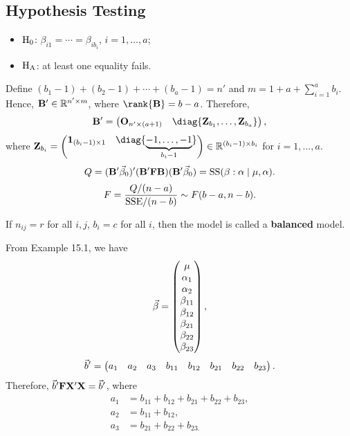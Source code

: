 \subsection*{Hypothesis Testing}
\begin{itemize}
    \item $ \text{H}_0 $: $ \beta_{i1}=\cdots=\beta_{ib_i} $, $ i=1,\ldots,a $;
    \item $ \text{H}_{\text{A}} $: at least one equality fails.
\end{itemize}
Define $ (b_1-1)+(b_2-1)+\cdots+(b_a-1)=n' $ and
$ m=1+a+\sum_{i=1}^{a}b_i $. Hence, $ \mathbf{B}'\in\mathbb{R}^{n'\times m} $, where $ \rank{\Matrix{B}}=b-a $. Therefore,
\[ \Matrix{B}'=\begin{pmatrix}
        \Matrix{O}_{n'\times (a+1)} & \diag{\Matrix{Z}_{b_1},\ldots,\Matrix{Z}_{b_a}}
    \end{pmatrix}, \]
where $ \Matrix{Z}_{b_i}=\begin{pmatrix}
        \Matrix{1}_{(b_i-1)\times 1} & \diag{\underbrace{-1,\ldots,-1}_{b_i-1}}
    \end{pmatrix}\in\R^{(b_i-1)\times b_i} $ for $ i=1,\ldots,a $.
\[ Q=(\mathbf{B}'\vec{\beta}_0)'(\mathbf{B}'\mathbf{F}\mathbf{B})(\mathbf{B}'\vec{\beta}_0)=\text{SS}(\beta:\alpha\mid \mu,\alpha).  \]
\[ F=\frac{Q/(n-a)}{\text{SSE}/(n-b)} \sim F(b-a,n-b). \]
\begin{Remark}{}{}
    If $ n_{ij}=r $ for all $ i,j $, $ b_i=c $ for all $ i $, then the model
    is called a \textbf{balanced} model.
\end{Remark}
From Example 15.1, we have
\[ \vec{\beta}=\begin{pmatrix}
        \mu        \\
        \alpha_1   \\
        \alpha_2   \\
        \beta_{11} \\
        \beta_{12} \\
        \beta_{21} \\
        \beta_{22} \\
        \beta_{23}
    \end{pmatrix}, \]
\[ \vec{b}'=\begin{pmatrix}
        a_1 & a_2 & a_3 & b_{11} & b_{12} & b_{21} & b_{22} & b_{23}
    \end{pmatrix}. \]
Therefore, $ \vec{b}'\mathbf{F}\mathbf{X}'\mathbf{X}=\vec{b}' $, where
\begin{align*}
    a_1 & = b_{11} + b_{12} + b_{21} + b_{22} + b_{23}, \\
    a_2 & =b_{11} +b_{12},                              \\
    a_3 & =b_{21}+b_{22}+b_{23.}
\end{align*}
